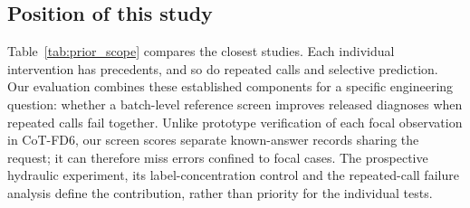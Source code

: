 \documentclass[11pt,a4paper]{article}
\begin{document}
\subsection{Position of this study}
Table~\ref{tab:prior_scope} compares the closest studies. Each individual intervention has precedents, and so do repeated calls and selective prediction. Our evaluation combines these established components for a specific engineering question: whether a batch-level reference screen improves released diagnoses when repeated calls fail together. Unlike prototype verification of each focal observation in CoT-FD6, our screen scores separate known-answer records sharing the request; it can therefore miss errors confined to focal cases. The prospective hydraulic experiment, its label-concentration control and the repeated-call failure analysis define the contribution, rather than priority for the individual tests.
\end{document}

